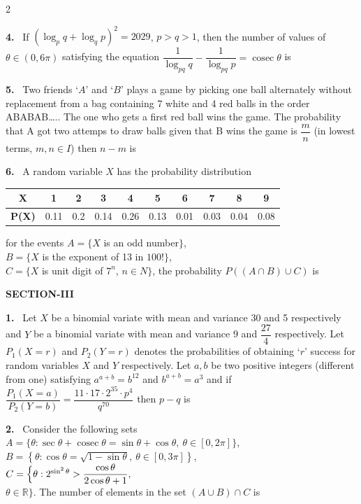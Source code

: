 \documentclass[10pt]{extarticle}
\newcommand{\sect}[1]{\par\smallskip\noindent\textbf{#1}\par}
\newcommand{\qn}[1]{\par\smallskip\noindent\textbf{#1.}~}
\begin{document}
\begin{multicols}{2}
\qn{4} If $\left(\log_pq+\log_qp\right)^2=2029$, $p>q>1$, then the number of values of $\theta\in(0,6\pi)$ satisfying the equation $\dfrac{1}{\log_{pq}q}-\dfrac{1}{\log_{pq}p}=\operatorname{cosec}\theta$ is

\qn{5} Two friends `$A$' and `$B$' plays a game by picking one ball alternately without replacement from a bag containing 7 white and 4 red balls in the order ABABAB\ldots.. The one who gets a first red ball wins the game. The probability that A got two attemps to draw balls given that B wins the game is $\dfrac mn$ (in lowest terms, $m,n\in I$) then $n-m$ is

\qn{6} A random variable $X$ has the probability distribution\par\smallskip
\begin{center}
\renewcommand{\arraystretch}{1.1}
\begin{tabular}{|c|c|c|c|c|c|c|c|c|c|}
\hline
\textbf{X} & 1 & 2 & 3 & 4 & 5 & 6 & 7 & 8 & 9\\
\hline
\textbf{P(X)} & 0.11 & 0.2 & 0.14 & 0.26 & 0.13 & 0.01 & 0.03 & 0.04 & 0.08\\
\hline
\end{tabular}
\end{center}
for the events $A=\{X$ is an odd number$\}$,\\
\hspace*{2em}$B=\{X$ is the exponent of 13 in $100!\}$,\\
\hspace*{2em}$C=\{X$ is unit digit of $7^n$, $n\in N\}$, the probability $P((A\cap B)\cup C)$ is

\sect{SECTION-III}
\qn{1} Let $X$ be a binomial variate with mean and variance 30 and 5 respectively and $Y$ be a binomial variate with mean and variance 9 and $\dfrac{27}{4}$ respectively. Let $P_1(X=r)$ and $P_2(Y=r)$ denotes the probabilities of obtaining `$r$' success for random variables $X$ and $Y$ respectively. Let $a,b$ be two positive integers (different from one) satisfying $a^{a+b}=b^{12}$ and $b^{a+b}=a^3$ and if $\dfrac{P_1(X=a)}{P_2(Y=b)}=\dfrac{11\cdot17\cdot2^{35}\cdot p^4}{q^{70}}$ then $p-q$ is

\qn{2} Consider the following sets\\
$A=\{\theta:\sec\theta+\operatorname{cosec}\theta=\sin\theta+\cos\theta,\ \theta\in[0,2\pi]\}$,\\
$B=\left\{\theta:\cos\theta=\sqrt{1-\sin\theta},\ \theta\in[0,3\pi]\right\}$,\\
$C=\Bigl\{\theta:2^{\sin^2\theta}>\dfrac{\cos\theta}{2\cos\theta+1},$\\
\hspace*{1em}$\theta\in\mathbb R\Bigr\}$. The number of elements in the set $(A\cup B)\cap C$ is


\end{multicols}
\end{document}
